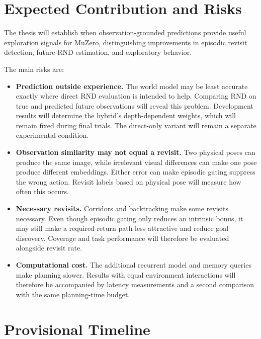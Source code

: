 \documentclass{article}
\begin{document}
\section{Expected Contribution and Risks}

The thesis will establish when observation-grounded predictions provide useful
exploration signals for MuZero, distinguishing improvements in episodic revisit
detection, future RND estimation, and exploratory behavior.

The main risks are:
\begin{itemize}
    \item \textbf{Prediction outside experience.} The world model may be least
    accurate exactly where direct RND evaluation is intended to help.
    Comparing RND on true and predicted future observations will reveal this
    problem. Development results will determine the hybrid's depth-dependent
    weights, which will remain fixed during final trials. The direct-only
    variant will remain a separate experimental condition.

    \item \textbf{Observation similarity may not equal a revisit.} Two
    physical poses can produce the same image, while irrelevant visual
    differences can make one pose produce different embeddings. Either
    error can make episodic gating suppress the wrong action. Revisit labels
    based on physical pose will measure how often this occurs.

    \item \textbf{Necessary revisits.} Corridors and backtracking make some
    revisits necessary. Even though episodic gating only reduces an intrinsic
    bonus, it may still make a required return path less attractive and reduce
    goal discovery. Coverage and task performance will therefore be evaluated
    alongside revisit rate.

    \item \textbf{Computational cost.} The additional recurrent model and
    memory queries make planning slower. Results with equal environment
    interactions will therefore be accompanied by latency measurements and a
    second comparison with the same planning-time budget.
\end{itemize}

\section{Provisional Timeline}
\end{document}
